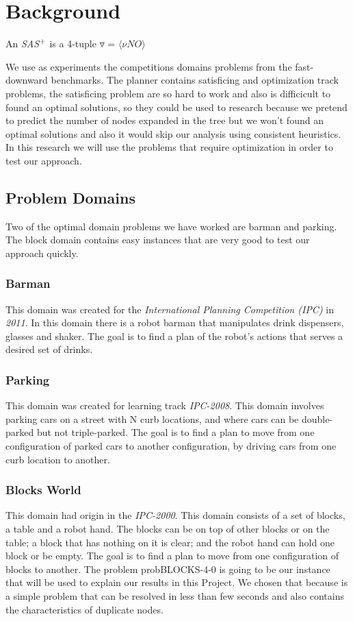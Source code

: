 \documentclass[11pt,a4paper,oneside]{report}
\begin{document}
\section{Background}
An \textit{SAS$\sp{+}$} \citep{backstrom1995complexity} is a 4-tuple 
$\triangledown$ = ${\langle \nu N O \rangle}$


We use as experiments the competitions domains problems from the fast-downward benchmarks. The planner contains satisficing and optimization track problems, the satisficing problem are so hard to work and also is difficicult to found an optimal solutions, so they could be used to research because we pretend to predict the number of nodes expanded in the tree but we won't found an optimal solutions and also it would skip our analysis using consistent heuristics. In this research we will use the problems that require optimization in order to test our approach. 

\subsection{Problem Domains}
Two of the optimal domain problems we have worked are barman and parking. The block domain contains easy instances that are very good to test our approach quickly.

\subsubsection{Barman}
This domain was created for the \textit{International Planning Competition (IPC)} in \textit{2011}. In this domain there is a robot barman that manipulates drink dispensers, glasses and shaker. The goal is to find a plan of the robot's actions that serves a desired set of drinks.

\subsubsection{Parking}
This domain was created for learning track \textit{IPC-2008}. This domain involves parking cars on a street with N curb locations, and where cars can be double-parked but not triple-parked. The goal is to find a plan to move from one configuration of parked cars to another configuration, by driving cars from one curb location to another. 

\subsubsection{Blocks World}
This domain had origin in the \textit{IPC-2000}. This domain consists of a set of blocks, a table and a robot hand. The blocks can be on top of other blocks or on the table; a block that has nothing on it is clear; and the robot hand can hold one block or be empty. The goal is to find a plan to move from one configuration of blocks to another. The problem probBLOCKS-4-0 is going to be our instance that will be used to explain our results in this Project. We chosen that because is a simple problem that can be resolved in less than few seconds and also contains the characteristics of duplicate nodes.
\end{document}
